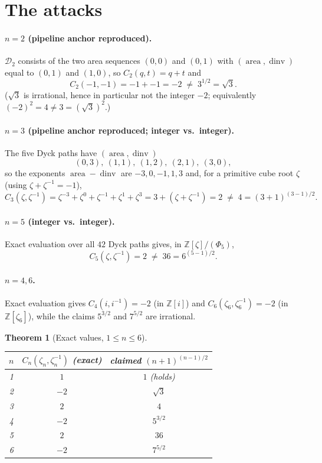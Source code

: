 \documentclass[11pt]{article}
\newtheorem{theorem}{Theorem}
\begin{document}
\section{The attacks}

\paragraph{$n=2$ (pipeline anchor reproduced).}
$\mathcal{D}_2$ consists of the two area sequences $(0,0)$ and $(0,1)$ with
$(\operatorname{area},\operatorname{dinv})$ equal to $(0,1)$ and $(1,0)$, so
$C_2(q,t)=q+t$ and
\[
  C_2(-1,-1) = -1 + -1 = -2 \;\ne\; 3^{1/2}=\sqrt3 .
\]
($\sqrt3$ is irrational, hence in particular not the integer $-2$; equivalently
$(-2)^2=4\ne 3=(\sqrt3)^2$.)

\paragraph{$n=3$ (pipeline anchor reproduced; integer vs.\ integer).}
The five Dyck paths have $(\operatorname{area},\operatorname{dinv})$
\[
  (0,3),\ (1,1),\ (1,2),\ (2,1),\ (3,0),
\]
so the exponents $\operatorname{area}-\operatorname{dinv}$ are $-3,0,-1,1,3$ and,
for a primitive cube root $\zeta$ (using $\zeta+\zeta^{-1}=-1$),
\[
  C_3(\zeta,\zeta^{-1}) = \zeta^{-3}+\zeta^{0}+\zeta^{-1}+\zeta^{1}+\zeta^{3}
  = 3 + (\zeta+\zeta^{-1}) = 2 \;\ne\; 4=(3+1)^{(3-1)/2}.
\]

\paragraph{$n=5$ (integer vs.\ integer).}
Exact evaluation over all $42$ Dyck paths gives, in $\mathbb{Z}[\zeta]/(\Phi_5)$,
\[
  C_5(\zeta,\zeta^{-1}) = 2 \;\ne\; 36 = 6^{(5-1)/2}.
\]

\paragraph{$n=4,6$.} Exact evaluation gives $C_4(i,i^{-1})=-2$ (in
$\mathbb{Z}[i]$) and $C_6(\zeta_6,\zeta_6^{-1})=-2$ (in $\mathbb{Z}[\zeta_6]$),
while the claims $5^{3/2}$ and $7^{5/2}$ are irrational.

\begin{theorem}[Exact values, $1\le n\le 6$]
\begin{center}
\begin{tabular}{ccc}
\toprule
$n$ & $C_n(\zeta_n,\zeta_n^{-1})$ (exact) & claimed $(n+1)^{(n-1)/2}$ \\
\midrule
1 & $1$ & $1$ (holds)\\
2 & $-2$ & $\sqrt3$ \\
3 & $2$ & $4$ \\
4 & $-2$ & $5^{3/2}$ \\
5 & $2$ & $36$ \\
6 & $-2$ & $7^{5/2}$ \\
\bottomrule
\end{tabular}
\end{center}
\end{theorem}
\end{document}
